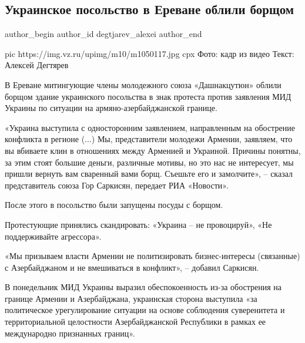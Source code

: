  
 
 
 
 
 
\subsection{Украинское посольство в Ереване облили борщом}
\label{sec:15_07_2020.news.ru.vz.degtjarev_alexei.1.ukr_posolstvo_erevan_borsch}
\ifcmt
	author_begin
   author_id degtjarev_alexei
	author_end
\fi


\ifcmt
  pic https://img.vz.ru/upimg/m10/m1050117.jpg
  cpx Фото: кадр из видео Текст: Алексей Дегтярев
\fi

В Ереване митингующие члены молодежного союза «Дашнакцутюн» облили борщом
здание украинского посольства в знак протеста против заявления МИД Украины по
ситуации на армяно-азербайджанской границе.

«Украина выступила с односторонним заявлением, направленным на обострение
конфликта в регионе (...) Мы, представители молодежи Армении, заявляем, что вы
вбиваете клин в отношениях между Арменией и Украиной. Причины понятны, за этим
стоят большие деньги, различные мотивы, но это нас не интересует, мы пришли
вернуть вам сваренный вами борщ. Съешьте его и замолчите», – сказал
представитель союза Гор Саркисян, передает РИА «Новости».

После этого в посольство были запущены посуды с борщом. 

Протестующие принялись скандировать: «Украина – не провоцируй», «Не
поддерживайте агрессора».

«Мы призываем власти Армении не политизировать бизнес-интересы (связанные) с
Азербайджаном и не вмешиваться в конфликт», – добавил Саркисян.

В понедельник МИД Украины выразил обеспокоенность из-за обострения на границе
Армении и Азербайджана, украинская сторона выступила «за политическое
урегулирование ситуации на основе соблюдения суверенитета и территориальной
целостности Азербайджанской Республики в рамках ее международно признанных
границ».


